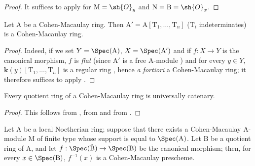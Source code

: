 \begin{proof}
It suffices to apply  for $\mathrm{M}=\sh{O}_y$ and $\mathrm{N}=\mathrm{B}=\sh{O}_x$.
\end{proof}

\begin{corollary}[6.3.6]
\label{IV.6.3.6}
Let $\mathrm{A}$ be a Cohen-Macaulay ring.
Then $\mathrm{A}'=\mathrm{A}[\mathrm{T}_1,\ldots,\mathrm{T}_n]$ ($\mathrm{T}_i$ indeterminates) is a Cohen-Macaulay ring.
\end{corollary}

\begin{proof}
Indeed, if we set $Y=\Spec(\mathrm{A})$, $X=\Spec(\mathrm{A}')$ and if $f:X\to Y$ is the canonical morphism, $f$ is \emph{flat} (since $\mathrm{A}'$ is a free $\mathrm{A}$-module ) and for every $y\in Y$, $\boldsymbol{k}(y)[\mathrm{T}_1,\ldots,\mathrm{T}_n]$ is a regular ring , hence \emph{a fortiori} a Cohen-Macaulay ring; it therefore suffices to apply .
\end{proof}

\begin{corollary}[6.3.7]
\label{IV.6.3.7}
Every quotient ring of a Cohen-Macaulay ring is universally catenary.
\end{corollary}

\begin{proof}
This follows from , from  and from .
\end{proof}

\begin{proposition}[6.3.8]
\label{IV.6.3.8}
Let $\mathrm{A}$ be a local Noetherian ring; suppose that there exists a Cohen-Macaulay $\mathrm{A}$-module $\mathrm{M}$ of finite type whose support is equal to $\Spec(\mathrm{A})$.
Let $\mathrm{B}$ be a quotient ring of $\mathrm{A}$, and let $f:\Spec(\hat{\mathrm{B}})\to\Spec(\mathrm{B})$ be the canonical morphism; then, for every $x\in\Spec(\mathrm{B})$, $f^{-1}(x)$ is a Cohen-Macaulay prescheme.
\end{proposition}

